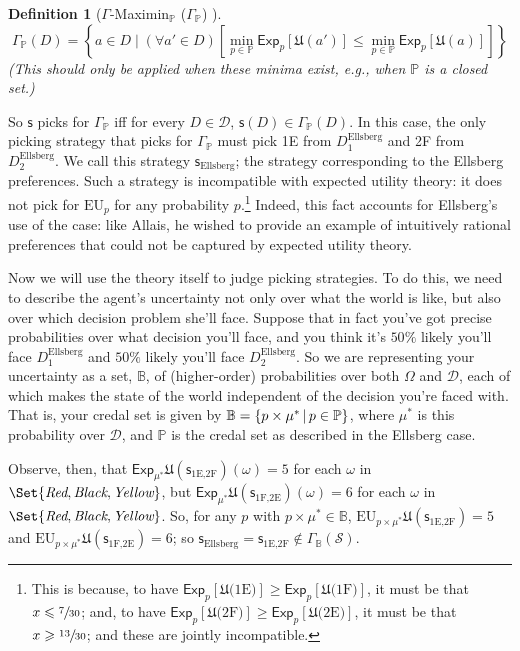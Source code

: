 \documentclass[a4paper]{article}
\newtheorem{definition}{Definition}
\renewcommand\P{\mathbb{P}} %
\newcommand\Exp{\mathsf{Exp}}
\newcommand\EU{\mathrm{EU}}
\newcommand\U{\mathfrak{U}} %
\newcommand\Maximin{\Gamma}
\newcommand{\D}{\mathcal{D}}
\renewcommand\S{\mathcal{S}}
\newcommand\s{\mathsf{s}}
\newcommand{\IB}{\mathbb{B}}
\newcommand{\IP}{\P}
\newcommand\SetDelimiter[1][]{
	\nonscript\,#1\vert \allowbreak \nonscript\,\mathopen{}}
\providecommand\given{\SetDelimiter}
\renewcommand{\leq}{\leqslant}
\renewcommand{\geq}{\geqslant}
\newenvironment{CCM rewritten}
{\begingroup\color{blue}} %
{\endgroup}              %
\begin{document}
\begin{definition}[$\Gamma$-Maximin$_\IP$ ($\Maximin_\IP$) ]
$$
\Maximin_\IP(D) = \left \{ a \in D \mid (\forall a' \in D)\left [\min_{p \in \IP} \Exp_p[\U(a')] \leq \min_{p \in \IP} \Exp_p[\U(a)] \right ] \right \}
$$
(This should only be applied when these minima exist, e.g., when $\IP$ is a closed set.)
\end{definition}

So $\s$ picks for $\Maximin_\IP$ iff for every $D\in\D$, $\s(D)\in\Maximin_\IP(D)$. In this case, the only picking strategy that picks for $\Maximin_\IP$ must pick 1E from $D^{\mathrm{Ellsberg}}_1$ and 2F from $D^{\mathrm{Ellsberg}}_2$. We call this strategy $\s_{\mathrm{Ellsberg}}$; the strategy corresponding to the Ellsberg preferences. Such a strategy is incompatible with expected utility theory: it does not pick for $\EU_p$ for any probability $p$.\footnote{\label{ftnte:Ellsberg not EU}This is because, to have $\Exp_p[\U(\text{1E)}]\geq \Exp_p[\U(\text{1F)}]$, it must be that $x\leq \sfrac{7}{30}$; and, to have  $\Exp_p[\U(\text{2F)}]\geq \Exp_p[\U(\text{2E)}]$, it must be that $x\geq \sfrac{13}{30}$; and these are jointly incompatible. } Indeed, this fact accounts for Ellsberg's use of the case: like Allais, he wished to provide an example of intuitively rational preferences that could not be captured by expected utility theory. 

Now we will use the theory itself to judge picking strategies. To do this, we need to describe the agent's uncertainty not only over what the world is like, but also over which decision problem she'll face. 
Suppose that in fact you've got precise probabilities over what decision you'll face, and you think it's $50\%$ likely you'll face $D^{\mathrm{Ellsberg}}_1$ and $50\%$ likely you'll face $D^{\mathrm{Ellsberg}}_2$. 
So we are representing your uncertainty as a set, $\IB$, of (higher-order) probabilities over both $\Omega$ and $\D$, each of which makes the state of the world independent of the decision you're faced with. 
{That is, your credal set is given by $\IB=\{p\times\mu^* \given p\in\IP\}$, where $\mu^*$ is this probability over $\D$, and $\IP$ is the credal set as described in the Ellsberg case.}

Observe, then, that $\Exp_{\mu^*}\U(\s_{\text{1E,2F}})(\omega)=5$ for each $\omega$ in $\Set{\emph{Red}, \emph{Black}, \emph{Yellow}}$, but $\Exp_{\mu^*}\U(\s_{\text{1F,2E}})(\omega)=6$ for each $\omega$ in $\Set{\emph{Red}, \emph{Black}, \emph{Yellow}}$. So, for any $p$ with $p\times \mu^*\in \IB$,  $\EU_{p\times\mu^*}\U(\s_{\text{1E,2F}})=5$ and  $\EU_{p\times\mu^*}\U(\s_{\text{1F,2E}})=6$; so $\s_{\mathrm{Ellsberg}}=\s_{\text{1E,2F}}\notin\Maximin_{\IB}(\S)$. 
\end{document}
